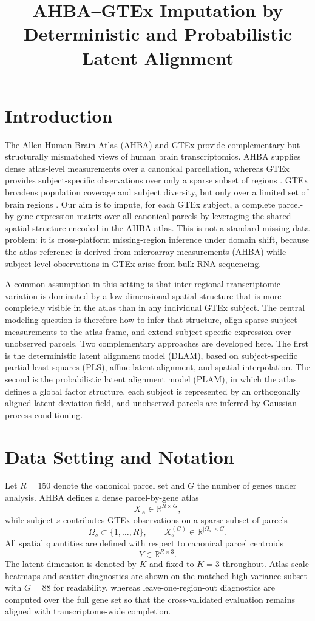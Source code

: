 \documentclass[11pt]{article}
\title{AHBA--GTEx Imputation by Deterministic and Probabilistic Latent Alignment}
\author{}
\date{}
\numberwithin{equation}{section}
\begin{document}
\maketitle

\section{Introduction}
The Allen Human Brain Atlas (AHBA) and GTEx provide complementary but structurally
mismatched views of human brain transcriptomics.  AHBA supplies dense atlas-level
measurements over a canonical parcellation, whereas GTEx provides subject-specific
observations over only a sparse subset of regions \cite{hawrylycz2012anatomically}.
GTEx broadens population coverage and subject diversity, but only over a limited set
of brain regions \cite{gtex2013genotype,gtex2017genetic,gtex2020atlas}.  Our aim is
to impute, for each GTEx subject, a complete parcel-by-gene expression matrix over
all canonical parcels by leveraging the shared spatial structure encoded in the AHBA
atlas.  This is not a standard missing-data problem: it is cross-platform
missing-region inference under domain shift, because the atlas reference is derived
from microarray measurements (AHBA) while subject-level observations in GTEx arise
from bulk RNA sequencing.

A common assumption in this setting is that inter-regional transcriptomic variation
is dominated by a low-dimensional spatial structure that is more completely visible
in the atlas than in any individual GTEx subject.  The central modeling question is
therefore how to infer that structure, align sparse subject measurements to the atlas
frame, and extend subject-specific expression over unobserved parcels.  Two
complementary approaches are developed here.  The first is the deterministic latent
alignment model (DLAM), based on subject-specific partial least squares (PLS), affine
latent alignment, and spatial interpolation.  The second is the probabilistic latent
alignment model (PLAM), in which the atlas defines a global factor structure, each
subject is represented by an orthogonally aligned latent deviation field, and
unobserved parcels are inferred by Gaussian-process conditioning.

\section{Data Setting and Notation}
Let $R=150$ denote the canonical parcel set and $G$ the number of genes under
analysis.  AHBA defines a dense parcel-by-gene atlas
\[
  X_A \in \mathbb{R}^{R \times G},
\]
while subject $s$ contributes GTEx observations on a sparse subset of parcels
\[
  \Omega_s \subset \{1,\dots,R\},
  \qquad
  X_s^{(G)} \in \mathbb{R}^{|\Omega_s| \times G}.
\]
All spatial quantities are defined with respect to canonical parcel centroids
\[
  Y \in \mathbb{R}^{R \times 3}.
\]
The latent dimension is denoted by $K$ and fixed to $K=3$ throughout.  Atlas-scale
heatmaps and scatter diagnostics are shown on the matched high-variance subset with
$G=88$ for readability, whereas leave-one-region-out diagnostics are computed over the
full gene set so that the cross-validated evaluation remains aligned with
transcriptome-wide completion.
\end{document}
